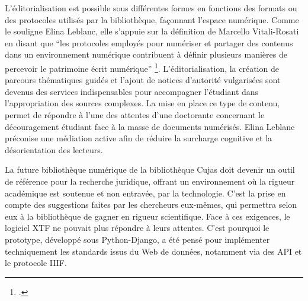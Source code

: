 L'éditorialisation est possible sous différentes formes en fonctions des formats ou des protocoles utilisés par la bibliothèque, façonnant l'espace numérique. Comme le souligne Elina Leblanc, elle s'appuie sur la définition de Marcello Vitali-Rosati en disant que \enquote{les protocoles employés pour numériser et partager des contenus dans un environnement numérique contribuent à définir plusieurs manières de percevoir le patrimoine  écrit numérique} \footcite{leblancBibliothequesNumeriquesEnrichies}. L'éditorialisation, la création de parcours thématiques guidés et l'ajout de notices d'autorité vulgarisées sont devenus des services indispensables pour accompagner l'étudiant dans l'appropriation des sources complexes. La mise en place ce type de contenu, permet de répondre à l'une des attentes d'une doctorante concernant le découragement étudiant face à la masse de documents numérisés. Elina Leblanc préconise une médiation active afin de réduire la surcharge cognitive et la désorientation des lecteurs.
\bigskip

La future bibliothèque numérique de la bibliothèque Cujas doit devenir un outil de référence pour la recherche juridique, offrant un environnement où la rigueur académique est soutenue et non entravée, par la technologie. C'est la prise en compte des suggestions faites par les chercheurs eux-mêmes, qui permettra selon eux à la bibliothèque de gagner en rigueur scientifique. Face à ces exigences, le logiciel XTF ne pouvait plus répondre à leurs attentes. C'est pourquoi le prototype, développé sous Python-Django, a été pensé pour implémenter techniquement les standards issus du Web de données, notamment via des API et le protocole IIIF.